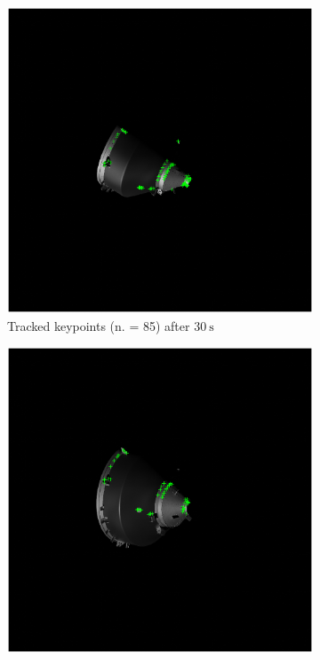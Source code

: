 \begin{figure}[!ht]
\begin{subfigure}[b]{0.32\textwidth}
         \includegraphics[clip,trim= 6cm 6cm 6cm 6cm,width=\textwidth]{Images/t30.eps}
         \caption{Tracked keypoints (n. = 85) after $\SI{30}{\second}$}
         \label{fig:t30}
     \end{subfigure}
     \hfill
     \begin{subfigure}[b]{0.32\textwidth}
         \centering
         \includegraphics[clip,trim= 6cm 6cm 6cm 6cm,width=\textwidth]{Images/t60.eps}

\end{subfigure}
\end{figure}

